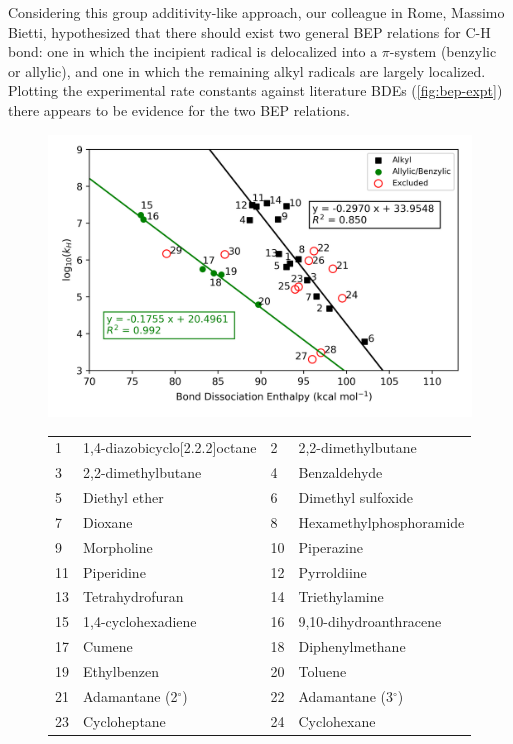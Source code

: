 Considering this group additivity-like approach, our colleague in Rome, Massimo
Bietti, hypothesized that there should exist two general BEP relations for C-H
bond: one in which the incipient radical is delocalized into a $\pi$-system
(benzylic or allylic), and one in which the remaining alkyl radicals are
largely localized. Plotting the experimental rate constants against literature
BDEs (\ref{fig:bep-expt}) there appears to be evidence for the two BEP
relations.

\begin{figure}[!htbp]
  \centering
  \includegraphics[width=\textwidth]{figures/bep-expt}
\begin{tabularx}{\textwidth}{| l X l X |}
  \hline
  1 & 1,4-diazobicyclo[2.2.2]octane & 2 & 2,2-dimethylbutane \\
  3 & 2,2-dimethylbutane & 4 & Benzaldehyde \\
  5 & Diethyl ether & 6 & Dimethyl sulfoxide \\
  7 & Dioxane & 8 & Hexamethylphosphoramide \\
  9 & Morpholine & 10 & Piperazine \\
  11 & Piperidine & 12 & Pyrroldiine \\
  13 & Tetrahydrofuran & 14 & Triethylamine \\
  15 & 1,4-cyclohexadiene & 16 & 9,10-dihydroanthracene \\
  17 & Cumene & 18 & Diphenylmethane \\
  19 & Ethylbenzen & 20 & Toluene \\
  21 & Adamantane (2$^\circ$) & 22 & Adamantane (3$^\circ$) \\
  23 & Cycloheptane & 24 & Cyclohexane \\

\end{tabularx}
\end{figure}
